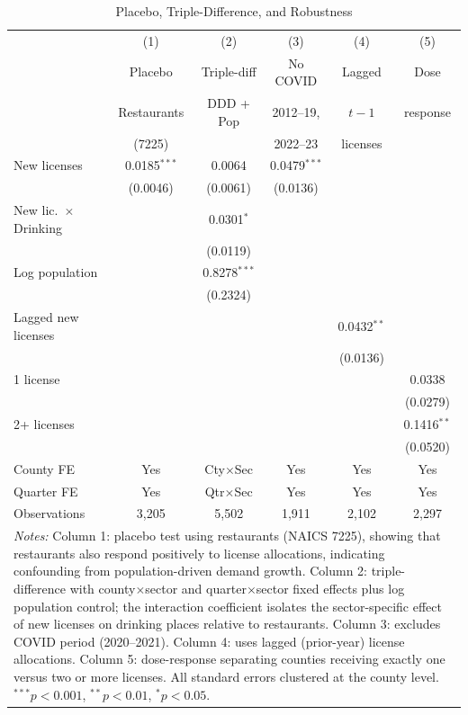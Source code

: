 \begin{table}[htbp]
\centering
\caption{Placebo, Triple-Difference, and Robustness}
\label{tab:robust}
\begin{tabular}{lccccc}
\hline\hline
& (1) & (2) & (3) & (4) & (5) \\
& Placebo & Triple-diff & No COVID & Lagged & Dose \\
& Restaurants & DDD + Pop & 2012--19, & $t-1$ & response \\
& (7225) & & 2022--23 & licenses & \\
\hline
New licenses & 0.0185$^{***}$ & 0.0064 & 0.0479$^{***}$ & & \\
& (0.0046) & (0.0061) & (0.0136) & & \\
New lic.\ $\times$ Drinking & & 0.0301$^{*}$ & & & \\
& & (0.0119) & & & \\
Log population & & 0.8278$^{***}$ & & & \\
& & (0.2324) & & & \\
Lagged new licenses & & & & 0.0432$^{**}$ & \\
& & & & (0.0136) & \\
1 license & & & & & 0.0338 \\
& & & & & (0.0279) \\
2+ licenses & & & & & 0.1416$^{**}$ \\
& & & & & (0.0520) \\
County FE & Yes & Cty$\times$Sec & Yes & Yes & Yes \\
Quarter FE & Yes & Qtr$\times$Sec & Yes & Yes & Yes \\
Observations & 3,205 & 5,502 & 1,911 & 2,102 & 2,297 \\
\hline\hline
\multicolumn{6}{p{0.95\textwidth}}{\footnotesize\textit{Notes:} Column 1: placebo test using restaurants (NAICS 7225), showing that restaurants also respond positively to license allocations, indicating confounding from population-driven demand growth. Column 2: triple-difference with county$\times$sector and quarter$\times$sector fixed effects plus log population control; the interaction coefficient isolates the sector-specific effect of new licenses on drinking places relative to restaurants. Column 3: excludes COVID period (2020--2021). Column 4: uses lagged (prior-year) license allocations. Column 5: dose-response separating counties receiving exactly one versus two or more licenses. All standard errors clustered at the county level. $^{***}p<0.001$, $^{**}p<0.01$, $^{*}p<0.05$.}
\end{tabular}
\end{table}
